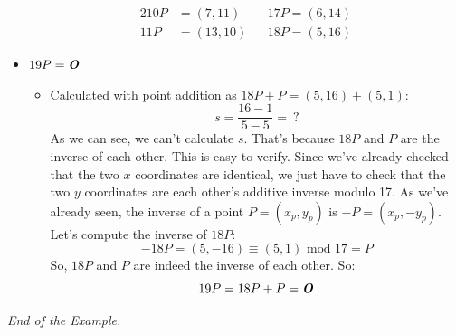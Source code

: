 \documentclass[11pt, a4paper]{article}
\newcommand{\mymod}{
    \text{ mod }
}
\begin{document}
\begin{itemize}
\begin{alignat*}{2}
        10P&=(7,11)&&17P=(6,14)\\
        11P&=(13,10)&&18P=(5,16)
    \end{alignat*}
    \item $19P=\text{\textbf{\textit{O}}}$
    \begin{itemize}
        \item Calculated with point addition as $18P + P = (5, 16) + (5, 1)$:
        $$s=\dfrac{16-1}{5-5}=\ ?$$
        As we can see, we can't calculate $s$. That's because $18P$ and $P$ are the inverse of each other. This is easy to verify. Since we've already checked that the two $x$ coordinates are identical, we just have to check that the two $y$ coordinates are each other's additive inverse modulo 17. As we've already seen, the inverse of a point $P=(x_p,y_p)$ is $-P=(x_p,-y_p)$. Let's compute the inverse of $18P$:
        $$-18P=(5,-16)\equiv(5,1)\mymod17=P$$
        So, $18P$ and $P$ are indeed the inverse of each other. So:
        $$19P=18P+P=\text{\textbf{\textit{O}}}$$
    \end{itemize}
\end{itemize}
\textit{End of the Example.}
\end{document}
